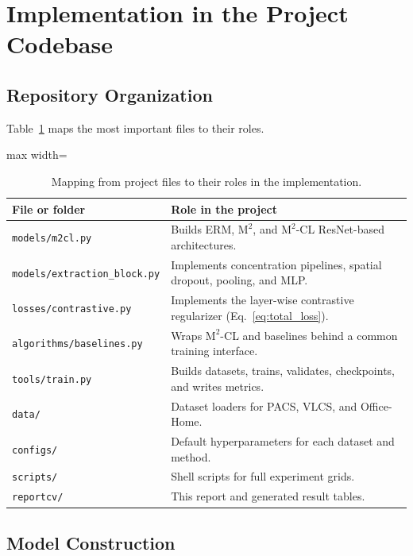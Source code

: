 \documentclass[11pt,a4paper]{article}
\newcommand{\method}{\texorpdfstring{$\mathrm{M}^2$\textup{-CL}}{M2-CL}}
\newcommand{\base}{\texorpdfstring{$\mathrm{M}^2$}{M2}}
\newcommand{\codepath}[1]{\texttt{\small #1}}
\begin{document}
\section{Implementation in the Project Codebase}

\subsection{Repository Organization}

Table~\ref{tab:codebase_map} maps the most important files to their roles.

\begin{table}[H]
\centering
\caption{Mapping from project files to their roles in the implementation.}
\label{tab:codebase_map}
\small
\begin{adjustbox}{max width=\textwidth}
\begin{tabular}{ll}
\toprule
\rowcolor{headerblue}
File or folder & Role in the project \\
\midrule
\codepath{models/m2cl.py}          & Builds ERM, \base{}, and \method{} ResNet-based architectures. \\
\codepath{models/extraction\_block.py} & Implements concentration pipelines, spatial dropout, pooling, and MLP. \\
\codepath{losses/contrastive.py}   & Implements the layer-wise contrastive regularizer (Eq.~\ref{eq:total_loss}). \\
\codepath{algorithms/baselines.py} & Wraps \method{} and baselines behind a common training interface. \\
\codepath{tools/train.py}          & Builds datasets, trains, validates, checkpoints, and writes metrics. \\
\codepath{data/}                   & Dataset loaders for PACS, VLCS, and Office-Home. \\
\codepath{configs/}                & Default hyperparameters for each dataset and method. \\
\codepath{scripts/}                & Shell scripts for full experiment grids. \\
\codepath{reportcv/}               & This report and generated result tables. \\
\bottomrule
\end{tabular}
\end{adjustbox}
\end{table}

\subsection{Model Construction}
\end{document}
